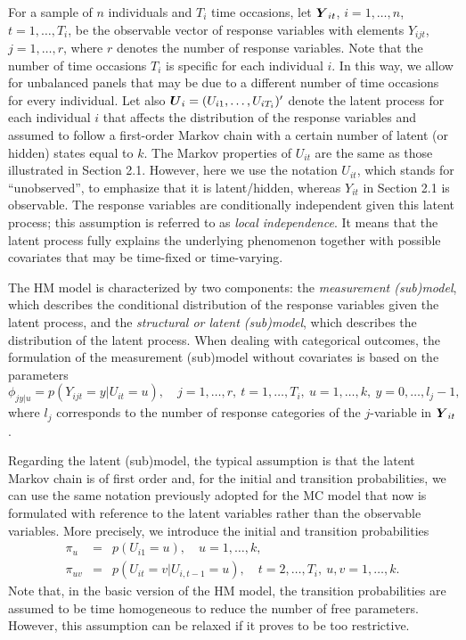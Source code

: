 For a sample of \(n\) individuals and \(T_i\) time occasions, let
\(\mbox{\boldmath $Y$}_{it}\), \(i=1,\ldots,n\), \(t=1,\ldots,T_i\), be the observable vector
of response variables with elements \(Y_{ijt}\), \(j=1,\ldots,r\), where \(r\)
denotes the number of response variables. Note that the number of time
occasions \(T_i\) is specific for each individual \(i\). In this way, we
allow for unbalanced panels that may be due to a different number of
time occasions for every individual. Let also
\(\mbox{\boldmath $U$}_i = (U_{i1},\ldots,U_{iT_i})^\prime\) denote the latent process
for each individual \(i\) that affects the distribution of the response
variables and assumed to follow a first-order Markov chain with a
certain number of latent (or hidden) states equal to \(k\). The Markov
properties of \(U_{it}\) are the same as those illustrated in Section 2.1. However, here we use the notation \(U_{it}\), which stands for ``unobserved'', to emphasize that it is latent/hidden, whereas
\(Y_{it}\) in Section 2.1 is observable. The
response variables are conditionally independent given this latent
process; this assumption is referred to as \emph{local independence}. It
means that the latent process fully explains the underlying phenomenon
together with possible covariates that may be time-fixed or
time-varying.

The HM model is characterized by two components: the \emph{measurement
(sub)model}, which describes the conditional distribution of the
response variables given the latent process, and the \emph{structural or
latent (sub)model}, which describes the distribution of the latent
process. When dealing with categorical outcomes, the formulation of the
measurement (sub)model without covariates is based on the parameters
\begin{equation}
\phi_{jy|u} = p(Y_{ijt} = y | U_{it} = u),\quad
j = 1,\ldots,r,  \: t = 1,\ldots,T_i, \: u = 1, \ldots, k,\: y = 0,\ldots, l_j - 1,
\label{eq:hmcond}
\end{equation} where \(l_j\) corresponds to the number of response
categories of the \(j\)-variable in \(\mbox{\boldmath $Y$}_{it}\).

Regarding the latent (sub)model, the typical assumption is that the
latent Markov chain is of first order and, for the initial and
transition probabilities, we can use the same notation previously
adopted for the MC model that now is formulated with reference to the latent variables
rather than the observable variables. More precisely, we introduce the
initial and transition probabilities \begin{eqnarray*}
\pi_{u}&=&p(U_{i1}=u),\quad u=1,\ldots,k,\\
\pi_{uv}&=&p(U_{it}=v|U_{i,t-1}=u),\quad t=2,\ldots,T_i,\: u,v=1,\ldots,k.
\end{eqnarray*} Note that, in the basic version of the HM model, the
transition probabilities are assumed to be time homogeneous to reduce
the number of free parameters. However, this assumption can be relaxed if it proves to be too restrictive.

